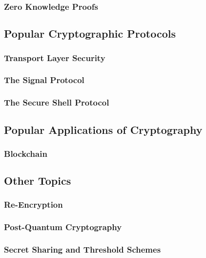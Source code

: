 \subsubsection{Zero Knowledge Proofs}\label{future_sec:advanced_cryptography:zero_knowledge_proofs}

\subsection{Popular Cryptographic Protocols}\label{future_sec:popular_cryptographic_protocols}
\subsubsection{Transport Layer Security}\label{future_sec:popular_protocols:tls}
\subsubsection{The Signal Protocol}\label{future_sec:popular_protocols:signal}
\subsubsection{The Secure Shell Protocol}\label{future_sec:popular_protocols:ssh}

\subsection{Popular Applications of Cryptography}\label{future_sec:popular_applications}
\subsubsection{Blockchain}\label{future_sec:popular_applications:blockchain}

\subsection{Other Topics}
\subsubsection{Re-Encryption}\label{future_sec:re_encryption}
\subsubsection{Post-Quantum Cryptography}\label{future_sec:post_quantum_cryptography}
\subsubsection{Secret Sharing and Threshold Schemes}\label{future_sec:secret_sharing_and_threshold_schemes}
